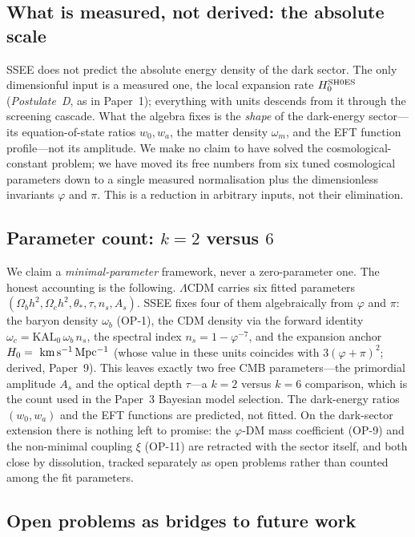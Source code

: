 \documentclass[aps,prd,preprint,amsmath,amssymb,nofootinbib,longbibliography]{revtex4-2}
\newcommand{\kms}{\mathrm{km\,s^{-1}\,Mpc^{-1}}}
\begin{document}
\subsection{What is measured, not derived: the absolute scale}

SSEE does not predict the absolute energy density of the dark sector. The
only dimensionful input is a measured one, the local expansion rate
$H_0^{\rm SH0ES}$ (\emph{Postulate~D}, as in Paper~1); everything with units descends
from it through the screening cascade.
What the algebra fixes is the \emph{shape} of the dark-energy sector---its
equation-of-state ratios $w_0,w_a$, the matter density $\omega_m$, and the EFT
function profile---not its amplitude. We make no claim to have solved the
cosmological-constant problem; we have moved its free numbers from six tuned
cosmological parameters down to a single measured normalisation plus the
dimensionless invariants $\varphi$ and $\pi$. This is a reduction in arbitrary
inputs, not their elimination.

\subsection{Parameter count: $k=2$ versus $6$}

We claim a \emph{minimal-parameter} framework, never a zero-parameter one. The
honest accounting is the following. $\Lambda$CDM carries six fitted parameters
$(\Omega_b h^2,\Omega_c h^2,\theta_*,\tau,n_s,A_s)$. SSEE fixes four of them
algebraically from $\varphi$ and $\pi$: the baryon density $\omega_b$ (OP-1), the
CDM density via the forward identity $\omega_c=\mathrm{KAL}_0\,\omega_b\,n_s$, the
spectral index $n_s=1-\varphi^{-7}$, and the expansion anchor $H_0=\val{H0_GLOBAL_d3}~\kms$
(whose value in these units coincides with $3(\varphi+\pi)^2$; derived, Paper~9). This leaves exactly two free CMB parameters---the primordial
amplitude $A_s$ and the optical depth $\tau$---a $k=2$ versus $k=6$ comparison,
which is the count used in the Paper~3 Bayesian model selection. The dark-energy
ratios $(w_0,w_a)$ and the EFT functions are predicted, not fitted. On the
dark-sector extension there is nothing left to promise: the $\varphi$-DM mass
coefficient (OP-9) and the non-minimal coupling $\xi$ (OP-11) are retracted
with the sector itself, and both close by dissolution, tracked separately
as open problems rather than counted among the fit parameters.

\subsection{Open problems as bridges to future work}
\end{document}
